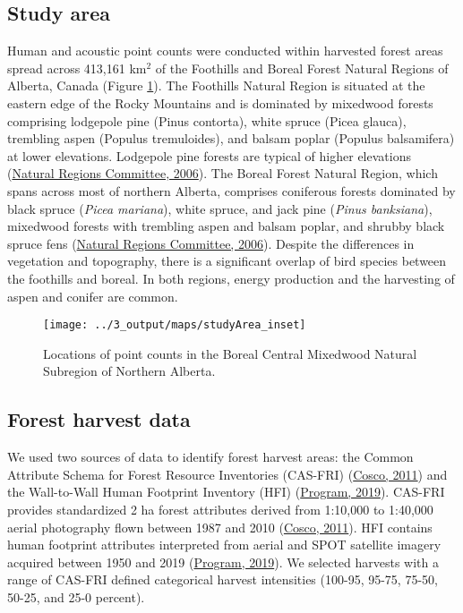 \documentclass[
  12pt,
]{article}
\begin{document}
\hypertarget{study-area}{%
\subsection{Study area}\label{study-area}}

Human and acoustic point counts were conducted within harvested forest areas spread across 413,161 km\(^2\) of the Foothills and Boreal Forest Natural Regions of Alberta, Canada (Figure \ref{fig:studyArea}). The Foothills Natural Region is situated at the eastern edge of the Rocky Mountains and is dominated by mixedwood forests comprising lodgepole pine (Pinus contorta), white spruce (Picea glauca), trembling aspen (Populus tremuloides), and balsam poplar (Populus balsamifera) at lower elevations. Lodgepole pine forests are typical of higher elevations (\protect\hyperlink{ref-Downing2006}{Natural Regions Committee, 2006}). The Boreal Forest Natural Region, which spans across most of northern Alberta, comprises coniferous forests dominated by black spruce (\emph{Picea mariana}), white spruce, and jack pine (\emph{Pinus banksiana}), mixedwood forests with trembling aspen and balsam poplar, and shrubby black spruce fens (\protect\hyperlink{ref-Downing2006}{Natural Regions Committee, 2006}). Despite the differences in vegetation and topography, there is a significant overlap of bird species between the foothills and boreal. In both regions, energy production and the harvesting of aspen and conifer are common.

\begin{figure}[H]
\texttt{[image: ../3\_output/maps/studyArea\_inset]} \caption{Locations of point counts in the Boreal Central Mixedwood Natural Subregion of Northern Alberta.}\label{fig:studyArea}
\end{figure}

\hypertarget{forest-harvest-data}{%
\subsection{Forest harvest data}\label{forest-harvest-data}}

We used two sources of data to identify forest harvest areas: the Common Attribute Schema for Forest Resource Inventories (CAS-FRI) (\protect\hyperlink{ref-Cumming2011a}{Cosco, 2011}) and the Wall-to-Wall Human Footprint Inventory (HFI) (\protect\hyperlink{ref-abmi2019HFI}{Program, 2019}). CAS-FRI provides standardized 2 ha forest attributes derived from 1:10,000 to 1:40,000 aerial photography flown between 1987 and 2010 (\protect\hyperlink{ref-Cumming2011a}{Cosco, 2011}). HFI contains human footprint attributes interpreted from aerial and SPOT satellite imagery acquired between 1950 and 2019 (\protect\hyperlink{ref-abmi2019HFI}{Program, 2019}). We selected harvests with a range of CAS-FRI defined categorical harvest intensities (100-95, 95-75, 75-50, 50-25, and 25-0 percent).
\end{document}

